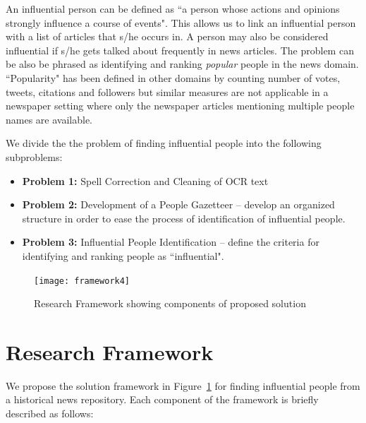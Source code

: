  An influential person can be defined as ``a person whose actions and opinions strongly influence a course of events". This allows us to link an influential person with a list of articles that s/he occurs in.
 A person may also be considered influential if s/he gets talked about frequently in news articles. The problem can be also be phrased as identifying and ranking \emph{popular} people in the news domain. 
 ``Popularity" has been defined in other domains by counting number of votes, tweets, citations and followers \cite{cheng2014can} but similar measures are not applicable in a newspaper setting where only the newspaper articles mentioning multiple people names are available.  
 
We divide the the problem of finding influential people into the following subproblems:
\begin{itemize}
\item \textbf{Problem 1: } Spell Correction and Cleaning of OCR text
\item \textbf{Problem 2: } Development of a People Gazetteer -- develop an organized structure in order to ease the process of identification of influential people.
\item \textbf{Problem 3: } Influential People Identification -- define the criteria for identifying and ranking people as ``influential".
\end{itemize}
  
\begin{figure}[h]
\centering
\texttt{[image: framework4]}
\caption{Research Framework showing components of proposed solution}
\label{fig:framework}
\end{figure} 

\section {Research Framework}

We propose the solution framework in Figure~\ref{fig:framework} for finding influential people from a historical news repository. Each component of the framework is briefly described as follows:

